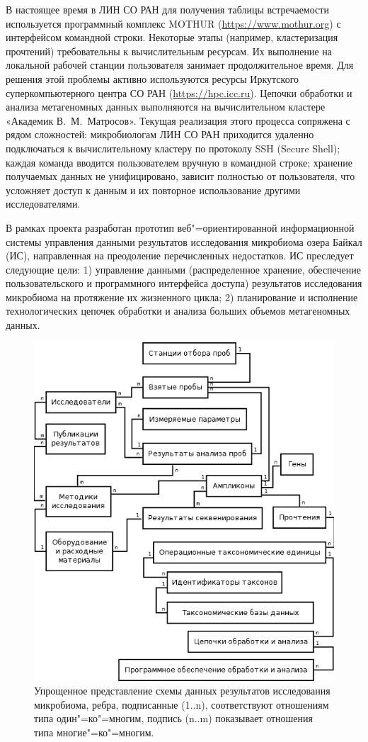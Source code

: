 \documentclass[a4paper,12pt,openany,final]{extreport}
\def\oldcaption{} \let\oldcaption=\caption
\def\caption{\stepcounter{captionsnum}\oldcaption}
\begin{document}
В настоящее время в ЛИН СО РАН для получения таблицы встречаемости используется программный комплекс MOTHUR (\href{https://www.mothur.org}{{https://www.mothur.org}}) с интерфейсом командной строки. Некоторые этапы (например, кластеризация прочтений) требовательны к вычислительным ресурсам. Их выполнение на локальной рабочей станции пользователя занимает продолжительное время. Для решения этой проблемы активно используются ресурсы Иркутского суперкомпьютерного центра СО РАН (\url{https://hpc.icc.ru}). Цепочки обработки и анализа метагеномных данных выполняются на вычислительном кластере «Академик В.~М.~Матросов». Текущая реализация этого процесса сопряжена с рядом сложностей: микробиологам ЛИН СО РАН приходится удаленно подключаться к вычислительному кластеру по протоколу SSH (Secure Shell); каждая команда вводится пользователем вручную в командной строке; хранение получаемых данных не унифицировано, зависит полностью от пользователя, что усложняет доступ к данным и их повторное использование другими исследователями.

В рамках проекта разработан прототип веб"=ориентированной информационной системы управления данными результатов исследования микробиома озера Байкал (ИС), направленная на преодоление перечисленных недостатков. ИС преследует следующие цели: 1) управление данными (распределенное хранение, обеспечение пользовательского и программного интерфейса доступа) результатов исследования микробиома на протяжение их жизненного цикла; 2) планирование и исполнение технологических цепочек обработки и анализа больших объемов метагеномных данных.

\begin{figure}\centering
\includegraphics[width=0.9\linewidth]{media/image15.png}

\caption{Упрощенное представление схемы данных результатов исследования микробиома, ребра, подписанные (1..n), соответствуют отношениям типа один"=ко"=многим, подпись (n..m) показывает отношения типа многие"=ко"=многим.}\label{fig:schemabd}
\end{figure}
\end{document}
